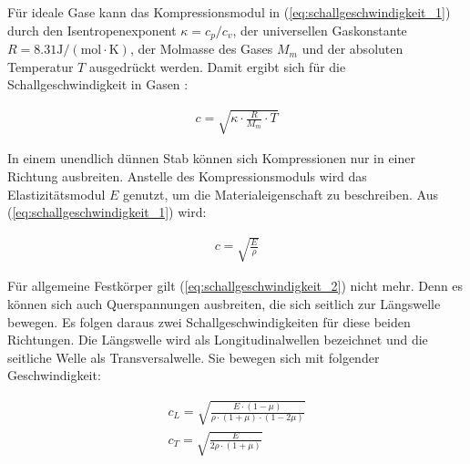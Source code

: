 Für ideale Gase kann das Kompressionsmodul in (\ref{eq:schallgeschwindigkeit_1}) durch den Isentropenexponent $\kappa = c_{p}/c_{v}$, der universellen Gaskonstante $R=8.31 \mathrm{J/(mol \cdot K)}$, der Molmasse des Gases $M_{m}$ und der absoluten Temperatur $T$ ausgedrückt werden. Damit ergibt sich für die Schallgeschwindigkeit in Gasen \cite{LOOSER}:

\begin{equation}
\begin{gathered}
 c = \sqrt{\kappa \cdot \frac{R}{M_{m}} \cdot T}
\end{gathered}\label{eq:schallgeschwindigkeit_in_gas}
\end{equation}

In einem unendlich dünnen Stab können sich Kompressionen nur in einer Richtung ausbreiten. Anstelle des Kompressionsmoduls wird das Elastizitätsmodul $E$ genutzt, um die Material\-eigenschaft zu beschreiben. Aus (\ref{eq:schallgeschwindigkeit_1}) wird:

\begin{equation}
\begin{gathered}
c = \sqrt{\frac{E}{\rho}}
\end{gathered}\label{eq:schallgeschwindigkeit_2}
\end{equation}

Für allgemeine Festkörper gilt  (\ref{eq:schallgeschwindigkeit_2}) nicht mehr. Denn es können sich auch Querspannungen ausbreiten, die sich seitlich zur Längswelle bewegen. Es folgen daraus zwei Schallgeschwindigkeiten für diese beiden Richtungen. Die Längswelle wird als Longitudinalwellen bezeichnet und die seitliche Welle als Transversalwelle. Sie bewegen sich mit folgender Geschwindigkeit:

\begin{equation}
\begin{gathered}
c_{L} = \sqrt{\frac{E \cdot (1-\mu )}{\rho \cdot (1+\mu )\cdot (1- 2 \mu )}}\\
c_{T} = \sqrt{\frac{E}{2\rho \cdot (1+\mu )}}
\end{gathered}\label{eq:schallgeschwindigkeit_3}
\end{equation}

